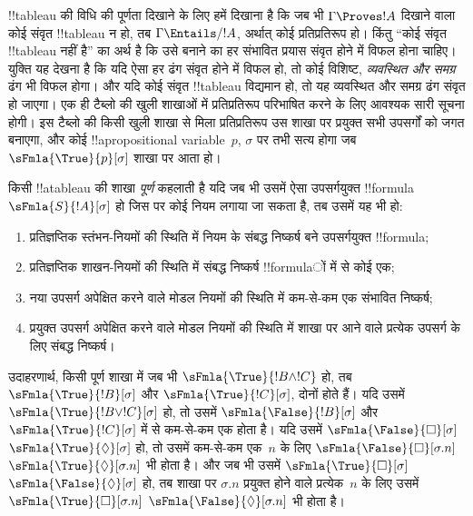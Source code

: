 \documentclass[../../../include/open-logic-section]{subfiles}
\begin{document}


\begin{explain}
  !!{tableau} की विधि की पूर्णता दिखाने के लिए हमें दिखाना है कि जब भी
  $\Gamma \Proves !A$ दिखाने वाला कोई संवृत !!{tableau} न हो, तब
  $\Gamma \Entails/ !A$, अर्थात् कोई प्रतिप्रतिरूप हो। किंतु ``कोई संवृत
  !!{tableau} नहीं है'' का अर्थ है कि उसे बनाने का हर संभावित प्रयास संवृत
  होने में विफल होना चाहिए। युक्ति यह देखना है कि यदि ऐसा हर ढंग संवृत होने
  में विफल हो, तो कोई विशिष्ट, \emph{व्यवस्थित और समग्र} ढंग भी विफल होगा।
  और यदि कोई संवृत !!{tableau} विद्यमान हो, तो यह व्यवस्थित और समग्र ढंग
  संवृत हो जाएगा। एक ही टैब्लो की खुली शाखाओं में प्रतिप्रतिरूप परिभाषित
  करने के लिए आवश्यक सारी सूचना होगी। इस टैब्लो की किसी खुली शाखा से मिला
  प्रतिप्रतिरूप उस शाखा पर प्रयुक्त सभी उपसर्गों को जगत बनाएगा, और कोई
  !!a{propositional variable}~$p$, $\sigma$ पर तभी सत्य होगा जब
  $\sFmla{\True}{p}[\sigma]$ शाखा पर आता हो।
\end{explain}

\begin{defn}
  किसी !!a{tableau} की शाखा \emph{पूर्ण} कहलाती है यदि जब भी उसमें ऐसा
  उपसर्गयुक्त !!{formula} $\sFmla{S}{!A}[\sigma]$ हो जिस पर कोई नियम लगाया
  जा सकता है, तब उसमें यह भी हो:
  \begin{enumerate}
    \item प्रतिज्ञप्तिक स्तंभन-नियमों की स्थिति में नियम के संबद्ध
      निष्कर्ष बने उपसर्गयुक्त !!{formula};
    \item प्रतिज्ञप्तिक शाखन-नियमों की स्थिति में संबद्ध निष्कर्ष
      !!{formula}ों में से कोई एक;
    \item नया उपसर्ग अपेक्षित करने वाले मोडल नियमों की स्थिति में
      कम-से-कम एक संभावित निष्कर्ष;
    \item प्रयुक्त उपसर्ग अपेक्षित करने वाले मोडल नियमों की स्थिति में
      शाखा पर आने वाले प्रत्येक उपसर्ग के लिए संबद्ध निष्कर्ष।
  \end{enumerate}
\end{defn}

\begin{explain}
उदाहरणार्थ, किसी पूर्ण शाखा में जब भी $\sFmla{\True}{!B \land !C}$ हो,
तब $\sFmla{\True}{!B}[\sigma]$ और $\sFmla{\True}{!C}[\sigma]$, दोनों
होते हैं। यदि उसमें $\sFmla{\True}{!B \lor !C}[\sigma]$ हो, तो उसमें
$\sFmla{\False}{!B}[\sigma]$ और $\sFmla{\True}{!C}[\sigma]$ में से
कम-से-कम एक होता है। यदि उसमें 
{$\sFmla{\False}{\Box}[\sigma]$} {$\sFmla{\True}{\Diamond}[\sigma]$} हो,
तो उसमें कम-से-कम एक~$n$ के लिए 
{$\sFmla{\False}{\Box}[\sigma.n]$}
{$\sFmla{\True}{\Diamond}[\sigma.n]$} भी होता है। और जब भी उसमें
 {$\sFmla{\True}{\Box}[\sigma]$}
{$\sFmla{\False}{\Diamond}[\sigma]$} हो, तब शाखा पर $\sigma.n$ प्रयुक्त
होने वाले प्रत्येक~$n$ के लिए उसमें 
{$\sFmla{\True}{\Box}[\sigma.n]$}
{$\sFmla{\False}{\Diamond}[\sigma.n]$} भी होता है।
\end{explain}
\end{document}
